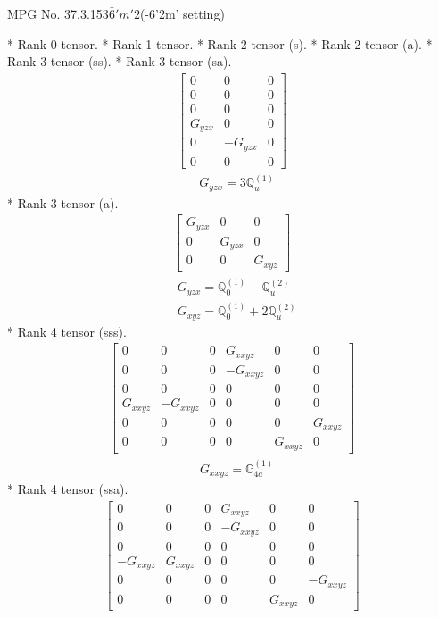 \documentclass[fleqn,8pt,landscape]{jsarticle}
\begin{document}
\setcounter{MaxMatrixCols}{32}

\renewcommand{\tablename}{Table~}
\renewcommand{\figurename}{Figure~}
\begin{center}
\LARGE
MPG No. 37.3.153\quad$\bar{6}'m'2$\quad(-6'2m' setting)
\end{center}
* Rank 0 tensor.
* Rank 1 tensor.
* Rank 2 tensor (s).
* Rank 2 tensor (a).
* Rank 3 tensor (ss).
* Rank 3 tensor (sa).
\begin{align*}
\begin{bmatrix} 0 & 0 & 0 \\ 0 & 0 & 0 \\ 0 & 0 & 0 \\ G_{yzx} & 0 & 0 \\ 0 & - G_{yzx} & 0 \\ 0 & 0 & 0 \end{bmatrix}
\end{align*}
\begin{align*}
& G_{yzx} = 3 \mathbb{Q}_{u}^{(1)}
\end{align*}
* Rank 3 tensor (a).
\begin{align*}
\begin{bmatrix} G_{yzx} & 0 & 0 \\ 0 & G_{yzx} & 0 \\ 0 & 0 & G_{xyz} \end{bmatrix}
\end{align*}
\begin{align*}
& G_{yzx} = \mathbb{Q}_{0}^{(1)} - \mathbb{Q}_{u}^{(2)} \\
& G_{xyz} = \mathbb{Q}_{0}^{(1)} + 2 \mathbb{Q}_{u}^{(2)}
\end{align*}
* Rank 4 tensor (sss).
\begin{align*}
\begin{bmatrix} 0 & 0 & 0 & G_{xxyz} & 0 & 0 \\ 0 & 0 & 0 & - G_{xxyz} & 0 & 0 \\ 0 & 0 & 0 & 0 & 0 & 0 \\ G_{xxyz} & - G_{xxyz} & 0 & 0 & 0 & 0 \\ 0 & 0 & 0 & 0 & 0 & G_{xxyz} \\ 0 & 0 & 0 & 0 & G_{xxyz} & 0 \end{bmatrix}
\end{align*}
\begin{align*}
& G_{xxyz} = \mathbb{G}_{4a}^{(1)}
\end{align*}
* Rank 4 tensor (ssa).
\begin{align*}
\begin{bmatrix} 0 & 0 & 0 & G_{xxyz} & 0 & 0 \\ 0 & 0 & 0 & - G_{xxyz} & 0 & 0 \\ 0 & 0 & 0 & 0 & 0 & 0 \\ - G_{xxyz} & G_{xxyz} & 0 & 0 & 0 & 0 \\ 0 & 0 & 0 & 0 & 0 & - G_{xxyz} \\ 0 & 0 & 0 & 0 & G_{xxyz} & 0 \end{bmatrix}
\end{align*}
\end{document}
